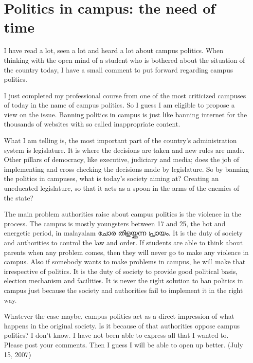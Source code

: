 \section*{Politics in campus: the need of time}
\vskip 2pt
I have read a lot, seen a lot and heard a lot about campus politics. 
When thinking with the open mind of a student who is bothered about 
the situation of the country today, I have a small comment to put forward regarding campus politics.

I just completed my professional course from one of the most criticized campuses of 
today in the name of campus politics. So I guess I am eligible to propose a view on the issue. 
Banning politics in campus is just like banning internet for the thousands of websites with 
so called inappropriate content.

What I am telling is, the most important part of the country’s administration system is legislature. 
It is where the decisions are taken and new rules are made. Other pillars of democracy, 
like executive, judiciary and media; does the job of implementing and cross checking the decisions 
made by legislature. So by banning the politics in campuses, what is today's society aiming at? Creating an 
uneducated legislature, so that it acts as a spoon in the arms of the enemies of the state?

The main problem authorities raise about campus politics is the violence in the process. The campus
is mostly youngsters between 17 and 25, the hot and energetic period, in malayalam ചോര തിളയ്ക്കുന്ന പ്രായം. 
It is the duty of society and authorities to control the law and order. If students are able to think about
parents when any problem comes, then they will never go to make any violence in campus. Also if somebody wants 
to make problems in campus, he will make that irrespective of politics. It is the duty of society to provide good
political basis, election mechanism and facilities. It is never the right solution to ban politics in campus just 
because the society and authorities fail to implement it in the right way. 

Whatever the case maybe, campus politics act as a direct impression of what happens in the original society. 
Is it because of that authorities oppose campus politics? I don’t know. I have not been able to express all that I wanted to. 
Please post your comments. Then I guess I will be able to open up better. 
(July 15, 2007)
\newpage
